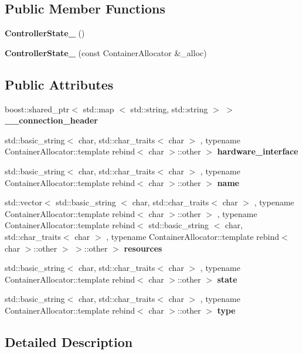 \subsection*{\-Public \-Member \-Functions}
\begin{DoxyCompactItemize}
\item 
{\bf \-Controller\-State\-\_\-} ()
\item 
{\bf \-Controller\-State\-\_\-} (const \-Container\-Allocator \&\-\_\-alloc)
\end{DoxyCompactItemize}
\subsection*{\-Public \-Attributes}
\begin{DoxyCompactItemize}
\item 
boost\-::shared\-\_\-ptr$<$ std\-::map\*
$<$ std\-::string, std\-::string $>$ $>$ {\bf \-\_\-\-\_\-connection\-\_\-header}
\item 
std\-::basic\-\_\-string$<$ char, \*
std\-::char\-\_\-traits$<$ char $>$\*
, typename \*
\-Container\-Allocator\-::template \*
rebind$<$ char $>$\-::other $>$ {\bf hardware\-\_\-interface}
\item 
std\-::basic\-\_\-string$<$ char, \*
std\-::char\-\_\-traits$<$ char $>$\*
, typename \*
\-Container\-Allocator\-::template \*
rebind$<$ char $>$\-::other $>$ {\bf name}
\item 
std\-::vector$<$ std\-::basic\-\_\-string\*
$<$ char, std\-::char\-\_\-traits$<$ char $>$\*
, typename \*
\-Container\-Allocator\-::template \*
rebind$<$ char $>$\-::other $>$\*
, typename \*
\-Container\-Allocator\-::template \*
rebind$<$ std\-::basic\-\_\-string\*
$<$ char, std\-::char\-\_\-traits$<$ char $>$\*
, typename \*
\-Container\-Allocator\-::template \*
rebind$<$ char $>$\-::other $>$\*
 $>$\-::other $>$ {\bf resources}
\item 
std\-::basic\-\_\-string$<$ char, \*
std\-::char\-\_\-traits$<$ char $>$\*
, typename \*
\-Container\-Allocator\-::template \*
rebind$<$ char $>$\-::other $>$ {\bf state}
\item 
std\-::basic\-\_\-string$<$ char, \*
std\-::char\-\_\-traits$<$ char $>$\*
, typename \*
\-Container\-Allocator\-::template \*
rebind$<$ char $>$\-::other $>$ {\bf type}
\end{DoxyCompactItemize}


\subsection{\-Detailed \-Description}
